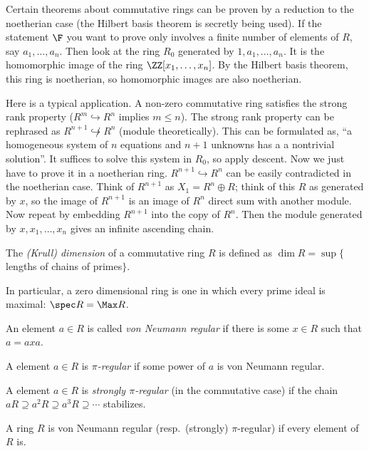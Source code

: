 
 Certain theorems about commutative rings can be proven by a reduction to the noetherian
 case (the Hilbert basis theorem is secretly being used). If the statement $\F$ you want
 to prove only involves a finite number of elements of $R$, say $a_1,\dots, a_n$. Then
 look at the ring $R_0$ generated by $1, a_1,\dots, a_n$. It is the homomorphic image of
 the ring $\ZZ[x_1,\dots, x_n]$. By the Hilbert basis theorem, this ring is noetherian,
 so homomorphic images are also noetherian.

 Here is a typical application. A non-zero commutative ring satisfies the strong rank
 property ($R^m\hookrightarrow R^n$ implies $m\le n$). The strong rank property can be
 rephrased as $R^{n+1}\not\hookrightarrow R^n$ (module theoretically). This can be
 formulated as, ``a homogeneous system of $n$ equations and $n+1$ unknowns has a a
 nontrivial solution''. It suffices to solve this system in $R_0$, so apply descent. Now
 we just have to prove it in a noetherian ring. $R^{n+1}\hookrightarrow R^n$ can be
 easily contradicted in the noetherian case. Think of $R^{n+1}$ as $X_1=R^n\oplus R$;
 think of this $R$ as generated by $x$, so the image of $R^{n+1}$ is an image of $R^n$
 direct sum with another module. Now repeat by embedding $R^{n+1}$ into the copy of
 $R^n$. Then the module generated by $x,x_1,\dots, x_n$ gives an infinite ascending
 chain.


 \begin{definition}
   The \emph{(Krull) dimension} of a commutative ring $R$ is defined as $\dim R =
   \sup\{$lengths of chains of primes$\}$.
 \end{definition}
 In particular, a zero dimensional ring is one in which every prime ideal is maximal:
 $\spec R=\Max R$.

 \begin{definition}
   An element $a\in R$ is called \emph{von Neumann regular} if there is some $x\in R$
   such that $a=axa$.
 \end{definition}
 \begin{definition}[McCoy]
   A element $a\in R$ is \emph{$\pi$-regular} if some power of $a$ is von Neumann
   regular.
 \end{definition}
 \begin{definition}
   A element $a\in R$ is \emph{strongly $\pi$-regular} (in the commutative case)
   if the chain $aR\supseteq a^2R\supseteq a^3R\supseteq \cdots$ stabilizes.
 \end{definition}
 A ring $R$ is von Neumann regular (resp.\ (strongly) $\pi$-regular) if every element of
 $R$ is.

